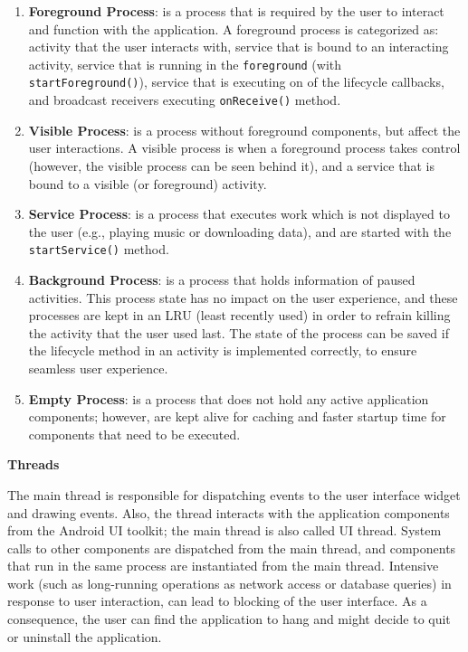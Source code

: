 \begin{enumerate}
    \item \textbf{Foreground Process}: is a process that is required by the user to interact and function with the application. A foreground process is  categorized as: activity that the user interacts with, service that is bound to an interacting activity, service that is running in the \verb|foreground| (with \verb|startForeground()|), service that is executing on of the lifecycle callbacks, and broadcast receivers executing \verb|onReceive()| method.
    \item \textbf{Visible Process}: is a process without foreground components, but affect the user interactions. A visible process is when a foreground process takes control (however, the visible process can be seen behind it), and a service that is bound to a visible (or foreground) activity. 
    \item \textbf{Service Process}: is a process that executes work which is not displayed to the user (e.g., playing music or downloading data), and are started with the \verb|startService()| method. 
    \item \textbf{Background Process}: is a process that holds information of paused activities. This process state has no impact on the user experience, and these processes are kept in an LRU (least recently used) in order to refrain killing the activity that the user used last. The state of the process can be saved if the lifecycle method in an activity is implemented correctly, to ensure seamless user experience. 
    \item \textbf{Empty Process}: is a process that does not hold any active application components; however, are kept alive for caching and faster startup time for components that need to be executed.  
\end{enumerate}


\noindent \textbf{Threads}

\noindent The main thread is responsible for dispatching events to the user interface widget and drawing events. Also, the thread interacts with the application components from the Android UI toolkit; the main thread is also called UI thread. System calls to other components are dispatched from the main thread, and components that run in the same process are instantiated from the main thread. Intensive work (such as long-running operations as network access or database queries) in response to user interaction, can lead to blocking of the user interface. As a consequence, the user can find the application to hang and might decide to quit or uninstall the application. 

